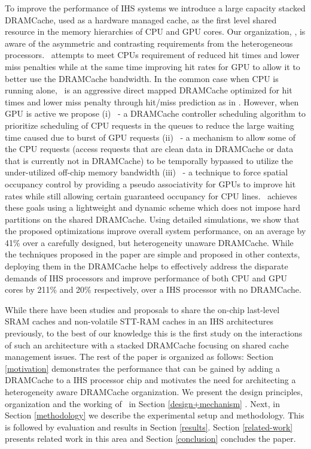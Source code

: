 \par To improve the performance of IHS systems we introduce a large capacity stacked DRAMCache, used as a hardware managed cache, as the first level shared resource in the memory hierarchies of CPU and GPU cores. Our organization, \cachename, is aware of the asymmetric and contrasting requirements from the heterogeneous processors. \cachename\ attempts to meet CPUs requirement of reduced hit times and lower miss penalties while at the same time improving hit rates for GPU to allow it to better use the DRAMCache bandwidth. In the common case when CPU is running alone, \cachename\ is an aggressive direct mapped DRAMCache optimized for hit times and lower miss penalty through hit/miss prediction as in \cite{alloy}. However, when GPU is active we propose (i) \prioname\ - a DRAMCache controller scheduling algorithm to prioritize scheduling of CPU requests in the queues to reduce the large waiting time caused due to burst of GPU requests (ii) \bypassname\ - a mechanism to allow some of the CPU requests (access requests that are clean data in DRAMCache or data that is currently not in DRAMCache) to be temporally bypassed to utilize the under-utilized off-chip memory bandwidth
(iii) \chaining\ - a technique to force spatial occupancy control by providing a pseudo associativity for GPUs to improve hit rates while still allowing certain guaranteed occupancy for CPU lines. \cachename\ achieves these goals using a lightweight and dynamic scheme which does not impose hard partitions on the shared DRAMCache. Using detailed simulations, we show that the proposed optimizations improve overall system performance, on an average by 41\% over a carefully designed, but heterogeneity unaware DRAMCache.
While the techniques proposed in the paper are simple and proposed in other contexts, deploying them in the DRAMCache helps to effectively address the disparate demands of IHS processors and improve performance of both CPU and GPU cores by 211\% and 20\% respectively, over a IHS processor with no DRAMCache.

\par While there have been studies and proposals to share the on-chip last-level SRAM caches \cite{helm,tap} and non-volatile STT-RAM caches \cite{oscar} in an IHS architectures previously, to the best of our knowledge this is the first study on the interactions of such an architecture with a stacked DRAMCache focusing on shared cache management issues.
The rest of the paper is organized as follows: Section \ref{motivation} demonstrates the performance that can be gained by adding a DRAMCache to a IHS processor chip and motivates the need for architecting a heterogeneity aware DRAMCache organization. We present the design principles, organization and the working of \cachename\ in Section \ref{design+mechanism} . Next, in Section \ref{methodology} we describe the experimental setup and methodology. This is followed by evaluation and results in Section \ref{results}. Section \ref{related-work} presents related work in this area and Section \ref{conclusion} concludes the paper.
